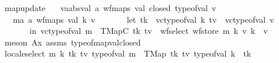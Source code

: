 \begin{isabellebody}
\endisatagproof
{\isafoldproof}%
%
\isadelimproof
\isanewline
%
\endisadelimproof
\isanewline
{}\isamarkupfalse%
\ map{\isacharunderscore}{\kern0pt}update{\isacharcolon}{\kern0pt}\isanewline
\ \ \ {\isachardoublequoteopen}{\isasymAnd}v{\isacharcolon}{\kern0pt}{\isacharcolon}{\kern0pt}{\isacharparenleft}{\kern0pt}{\isacharprime}{\kern0pt}a{\isacharcolon}{\kern0pt}{\isacharcolon}{\kern0pt}absval{\isacharcomma}{\kern0pt}\ {\isacharprime}{\kern0pt}a\ wf{\isacharunderscore}{\kern0pt}maps{\isacharparenright}{\kern0pt}\ val{\isachardot}{\kern0pt}\ closed\ {\isacharparenleft}{\kern0pt}type{\isacharunderscore}{\kern0pt}of{\isacharunderscore}{\kern0pt}val\ v{\isacharparenright}{\kern0pt}{\isachardoublequoteclose}\isanewline
\ \ \ {\isachardoublequoteopen}{\isasymforall}{\isacharparenleft}{\kern0pt}m{\isacharcolon}{\kern0pt}{\isacharcolon}{\kern0pt}{\isacharparenleft}{\kern0pt}{\isacharprime}{\kern0pt}a{\isacharcomma}{\kern0pt}\ {\isacharprime}{\kern0pt}a\ wf{\isacharunderscore}{\kern0pt}maps{\isacharparenright}{\kern0pt}\ val{\isacharparenright}{\kern0pt}\ k\ v{\isachardot}{\kern0pt}\isanewline
\ \ \ \ \ \ \ let\ tk\ {\isacharequal}{\kern0pt}\ vc{\isacharunderscore}{\kern0pt}type{\isacharunderscore}{\kern0pt}of{\isacharunderscore}{\kern0pt}val\ k{\isacharsemicolon}{\kern0pt}\ tv\ {\isacharequal}{\kern0pt}\ vc{\isacharunderscore}{\kern0pt}type{\isacharunderscore}{\kern0pt}of{\isacharunderscore}{\kern0pt}val\ v\isanewline
\ \ \ \ \ \ \ in\ vc{\isacharunderscore}{\kern0pt}type{\isacharunderscore}{\kern0pt}of{\isacharunderscore}{\kern0pt}val\ m\ {\isacharequal}{\kern0pt}\ TMapC\ tk\ tv\ {\isasymlongrightarrow}\ wf{\isacharunderscore}{\kern0pt}select\ {\isacharparenleft}{\kern0pt}wf{\isacharunderscore}{\kern0pt}store\ m\ k\ v{\isacharparenright}{\kern0pt}\ k\ {\isacharequal}{\kern0pt}\ v{\isachardoublequoteclose}\isanewline
%
\isadelimproof
\ \ %
\endisadelimproof
%
\isatagproof
{}\isamarkupfalse%
\ {\isacharparenleft}{\kern0pt}meson\ Ax{}\ assms\ type{\isacharunderscore}{\kern0pt}of{\isacharunderscore}{\kern0pt}mapval{\isacharunderscore}{\kern0pt}closed{\isacharparenright}{\kern0pt}%
\endisatagproof
{\isafoldproof}%
%
\isadelimproof
%
\endisadelimproof
%
\isadelimdocument
%
\endisadelimdocument
%
\isatagdocument
%
\isamarkuptrue%
%
\endisatagdocument
{\isafolddocument}%
%
\isadelimdocument
%
\endisadelimdocument
{}\isamarkupfalse%
\ locale{\isacharunderscore}{\kern0pt}select{\isacharcolon}{\kern0pt}\ {\isachardoublequoteopen}{\isasymAnd}m\ k\ tk\ tv{\isachardot}{\kern0pt}\ {\isasymlbrakk}type{\isacharunderscore}{\kern0pt}of{\isacharunderscore}{\kern0pt}val\ m\ {\isacharequal}{\kern0pt}\ TMap\ tk\ tv{\isacharsemicolon}{\kern0pt}\ type{\isacharunderscore}{\kern0pt}of{\isacharunderscore}{\kern0pt}val\ k\ {\isacharequal}{\kern0pt}\ tk{\isasymrbrakk}\isanewline

\end{isabellebody}

